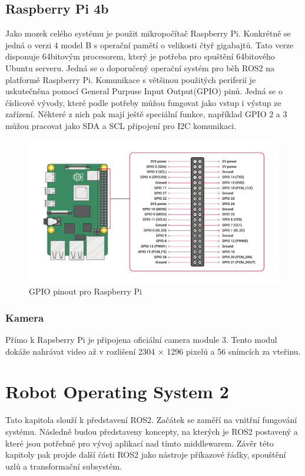 \section{Raspberry Pi 4b}
Jako mozek celého systému je použit mikropočítač Raspberry Pi. Konkrétně se jedná o verzi 4 model B s operační pamětí o velikosti čtyř gigabajtů. Tato verze disponuje 64bitovým procesorem, který je potřeba pro spuštění 64bitového Ubuntu serveru. Jedná se o doporučený operační systém pro běh ROS2 na platformě Raspberry Pi.
Komunikace s většinou použitých periferií je uskutečněna pomocí General Purpuse Input Output(GPIO) pinů. Jedná se o číslicové vývody, které podle potřeby můžou fungovat jako vstup i výstup ze zařízení. Některé z nich pak mají ještě speciální funkce, například GPIO 2 a 3 můžou pracovat jako SDA a SCL připojení pro I2C komunikaci.

\begin{figure}[h!]
	\centering
	\includegraphics[scale=0.15]{obrazky-figures/gpio_pinout.png}
	\caption{GPIO pinout pro Raspberry Pi}
	\label{}
\end{figure}

\subsection*{Kamera}
Přímo k Rapsberry Pi je připojena oficiální camera module 3. Tento modul dokáže nahrávat video až v rozlišení 2304 × 1296 pixelů a 56 snímcích za vteřinu. \cite{rpi_camera}

\chapter{Robot Operating System 2}
Tato kapitola slouží k představení ROS2. Začátek se zaměří na vnitřní fungování systému. Následně budou představeny koncepty, na kterých je ROS2 postavený a které jsou potřebné pro vývoj aplikací nad tímto middlewarem. Závěr této kapitoly pak projde další části ROS2 jako nástroje příkazové řádky, spouštění uzlů a transformační subsystém.

